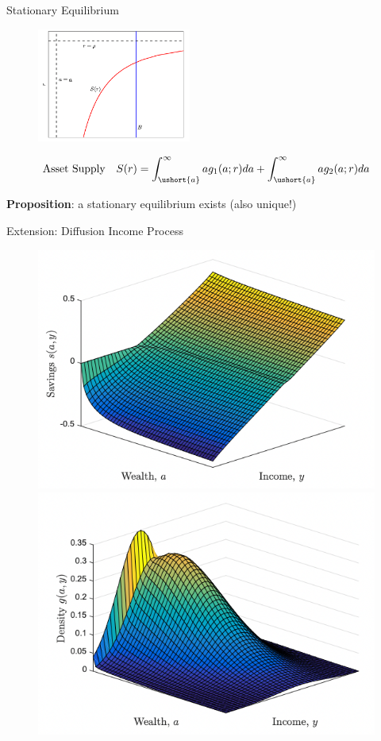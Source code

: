 \documentclass[11pt, aspectratio=169]{beamer}
\begin{document}
\begin{frame}{Stationary Equilibrium}
\begin{figure}[tph]
	\centering
	\includegraphics[width=0.45\textwidth]{./figures/HACT_existence}
\end{figure}

\vspace{-4mm}
{\small $$\mbox{Asset Supply} \quad S(r) = \int_{\ushort{a}}^\infty a g_1(a;r)da + \int_{\ushort{a}}^\infty a g_2(a;r)da $$}

\pause
\vspace{2mm}
{\color{blue}\textbf{Proposition}}: a stationary equilibrium exists (also unique!)
\end{frame}


\begin{frame}{Extension: Diffusion Income Process}
\begin{figure}[ht]
	\centering
	\includegraphics[width=.45\textwidth]{./figures/HACT_diffusion_savings} \qquad \includegraphics[width=.45\textwidth]{./figures/HACT_diffusion_distribution}
\end{figure}
\end{frame}
\end{document}
